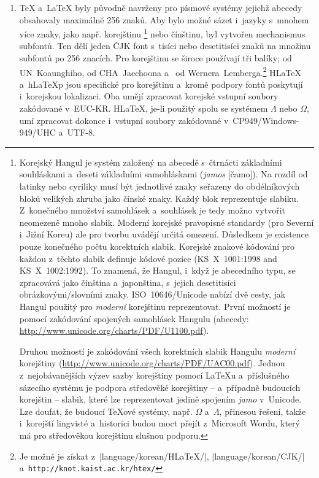 \begin{enumerate}
\item \TeX{} a~\LaTeX{} byly původně navrženy pro písmové systémy
jejichž abecedy obsahovaly maximálně 256 znaků. Aby bylo možné sázet
i~jazyky s~mnohem více znaky, jako např. korejštinu%
 \footnote{
 Korejský Hangul je systém založený na abecedě s~čtrnácti základními
 souhláskami a~deseti základními samohláskami (\emph{jamos} [čamo]). Na rozdíl od latinky
 nebo cyriliky musí být jednotlivé znaky seřazeny do obdélníkových bloků
 velikých zhruba jako čínské znaky. Každý blok reprezentuje slabiku.
 Z~konečného množství samohlásek a~souhlásek je tedy možno vytvořit
 neomezeně mnoho slabik. Moderní korejské pravopisné standardy (pro
 Severní i~Jižní Koreu) ale pro tvorbu uvádějí určitá omezení. Důsledkem
 je existence pouze konečného počtu korektních slabik. Korejské znakové
 kódování pro každou z~těchto slabik definuje kódové pozice
 (KS~X~1001:1998 and KS~X~1002:1992). To znamená, že Hangul, i~když je
 abecedního typu, se zpracovává jako čínština a~japonština, s~jejich
 desetitisíci obrázkovými/slovními znaky. ISO~10646/Unicode
 nabízí dvě cesty, jak Hangul použitý pro \emph{moderní} korejštinu
 reprezentovat. První možností je pomocí zakódování spojených samohlásek Hangulu
 (abecedy: \url{http://www.unicode.org/charts/PDF/U1100.pdf}). \par Druhou
 možností je zakódování všech korektních slabik Hangulu \emph{moderní}
 korejštiny (\url{http://www.unicode.org/charts/PDF/UAC00.pdf}). Jednou
 z~nejobávanějších výzev sazby korejštiny pomocí \LaTeX u a~příslušného
 sázecího systému je podpora středověké korejštiny -- a~případně
 budoucích korejštin -- slabik, které lze reprezentovat jedině spojením
 \emph{jamo} v~Unicode. Lze doufat, že budoucí \TeX ové systémy,
 např. $\Omega$ a~$\Lambda$, přinesou řešení, takže i~korejští lingvisté
 a~historici budou moct přejít z~Microsoft Wordu, který má pro středověkou
 korejštinu slušnou podporu.
 }
nebo čínštinu, byl vytvořen mechanismus subfontů. Ten dělí jeden ČJK font
s~tisíci nebo desetitisíci znaků na množinu subfontů po 256 znacích.
Pro korejštinu se široce používají tři balíky; 
od UN~Koaunghiho,  od CHA~Jaechoona a~
od Wernera~Lemberga.\footnote{%
\raggedright%
Je možné je získat z~\CTANref|language/korean/HLaTeX/|,
   \CTANref|language/korean/CJK/|
a~\texttt{http://knot.kaist.ac.kr/htex/}}
H\LaTeX{} a~h\LaTeX{}p jsou specifické pro korejštinu a~kromě podpory fontů
poskytují i~korejskou lokalizaci. Oba umějí zpracovat korejské vstupní soubory
zakódované v~EUC-KR. H\LaTeX{}, je-li použitý spolu se systémem $\Lambda$ nebo
$\Omega$, umí zpracovat dokonce i~vstupní soubory zakódované
v~CP949/Windows-949/UHC a~UTF-8.


\end{enumerate}
